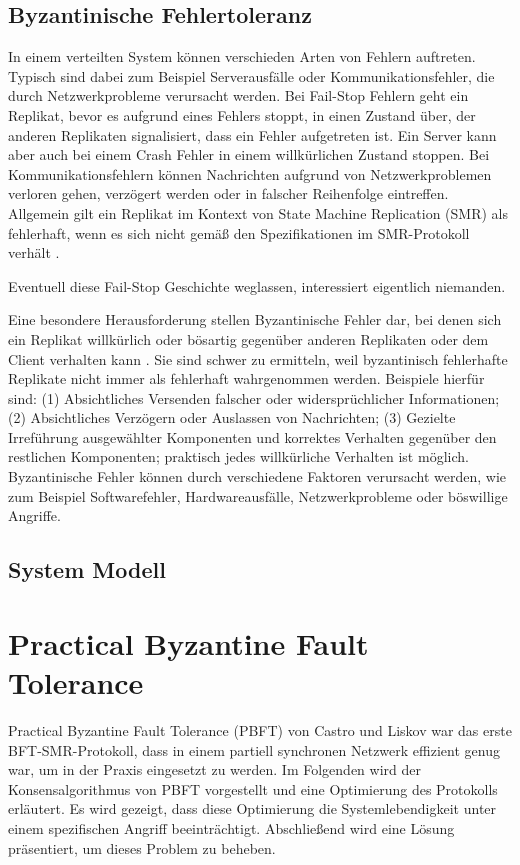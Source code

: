 \documentclass[nonacm,sigconf,natbib=false]{acmart}
\begin{document}
\subsection{Byzantinische Fehlertoleranz}

In einem verteilten System können verschieden Arten von Fehlern auftreten. Typisch sind dabei zum Beispiel Serverausfälle oder Kommunikationsfehler, die durch Netzwerkprobleme verursacht werden. Bei Fail-Stop Fehlern\cite{smr-schneider} geht ein Replikat, bevor es aufgrund eines Fehlers stoppt, in einen Zustand über, der anderen Replikaten signalisiert, dass ein Fehler aufgetreten ist. Ein Server kann aber auch bei einem Crash Fehler in einem willkürlichen Zustand stoppen. Bei Kommunikationsfehlern können Nachrichten aufgrund von Netzwerkproblemen verloren gehen, verzögert werden oder in falscher Reihenfolge eintreffen. Allgemein gilt ein Replikat im Kontext von State Machine Replication (SMR) als fehlerhaft, wenn es sich nicht gemäß den Spezifikationen im SMR-Protokoll verhält \cite{smr-schneider}.

Eventuell diese Fail-Stop Geschichte weglassen, interessiert eigentlich niemanden.

Eine besondere Herausforderung stellen Byzantinische Fehler dar, bei denen sich ein Replikat willkürlich oder bösartig gegenüber anderen Replikaten oder dem Client verhalten kann \cite{smr-schneider}. Sie sind schwer zu ermitteln, weil byzantinisch fehlerhafte Replikate nicht immer als fehlerhaft wahrgenommen werden. Beispiele hierfür sind: (1) Absichtliches Versenden falscher oder widersprüchlicher Informationen; (2) Absichtliches Verzögern oder Auslassen von Nachrichten; (3) Gezielte Irreführung ausgewählter Komponenten und korrektes Verhalten gegenüber den restlichen Komponenten; praktisch jedes willkürliche Verhalten ist möglich. Byzantinische Fehler können durch verschiedene Faktoren verursacht werden, wie zum Beispiel Softwarefehler, Hardwareausfälle, Netzwerkprobleme oder böswillige Angriffe.

\subsection{System Modell}

\section{Practical Byzantine Fault Tolerance}

Practical Byzantine Fault Tolerance (PBFT) \cite{pbft} von Castro und Liskov war das erste BFT-SMR-Protokoll, dass in einem partiell synchronen Netzwerk effizient genug war, um in der Praxis eingesetzt zu werden. Im Folgenden wird der Konsensalgorithmus von PBFT vorgestellt und eine Optimierung des Protokolls erläutert. Es wird gezeigt, dass diese Optimierung die Systemlebendigkeit unter einem spezifischen Angriff beeinträchtigt. Abschließend wird eine Lösung präsentiert, um dieses Problem zu beheben.
\end{document}
